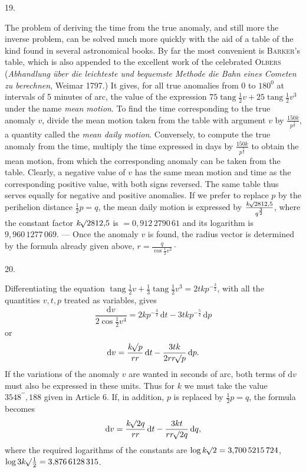 \par{}
\begin{center}
\hypertarget{native-037-article019}{}19.
\end{center}
The problem of deriving the time from the true anomaly, and still more the inverse problem, can be solved much more quickly with the aid of a table of the kind found in several astronomical books. By far the most convenient is \textsc{Barker}'s table, which is also appended to the excellent work of the celebrated \textsc{Olbers} (\emph{Abhandlung über die leichteste und bequemste Methode die Bahn eines Cometen zu berechnen}, Weimar 1797.) It gives, for all true anomalies from 0 to $180^0$ at intervals of 5 minutes of arc, the value of the expression $75\operatorname{tang}\frac{1}{2}v+25\operatorname{tang}\frac{1}{2}v^3$ under the name \emph{mean motion}. To find the time corresponding to the true anomaly $v$, divide the mean motion taken from the table with argument $v$ by $\frac{150k}{p^{\frac{3}{2}}}$, a quantity called the \emph{mean daily motion}. Conversely, to compute the true anomaly from the time, multiply the time expressed in days by $\frac{150k}{p^{\frac{3}{2}}}$ to obtain the mean motion, from which the corresponding anomaly can be taken from the table. Clearly, a negative value of $v$ has the same mean motion and time as the corresponding positive value, with both signs reversed. The same table thus serves equally for negative and positive anomalies. If we prefer to replace $p$ by the perihelion distance $\frac{1}{2}p=q$, the mean daily motion is expressed by $\frac{k\mathord{{}^{}\!\surd}2812{,}5}{q^{\frac{3}{2}}}$, where the constant factor $k\mathord{{}^{}\!\surd}2812{,}5$ is $=0{,}912\,2790\,61$ and its logarithm is $9{,}960\,1277\,069$. — Once the anomaly $v$ is found, the radius vector is determined by the formula already given above, $r=\frac{q}{\cos\frac{1}{2}v^2}\cdot$

\par{}
\begin{center}
\hypertarget{native-037-article020}{}20.
\end{center}
Differentiating the equation $\operatorname{tang}\frac{1}{2}v+\frac{1}{3}\operatorname{tang}\frac{1}{2}v^3=2t k p^{-\frac{3}{2}}$, with all the quantities $v,t,p$ treated as variables, gives
\[
\frac{\mathrm{d}v}{2\cos\frac{1}{2}v^4}=2k p^{-\frac{3}{2}}\,\mathrm{d}t-3t k p^{-\frac{5}{2}}\,\mathrm{d}p
\]
or
\[
\mathrm{d}v=\frac{k\mathord{{}^{}\!\surd}p}{r r}\,\mathrm{d}t-\frac{3t k}{2r r\mathord{{}^{}\!\surd}p}\,\mathrm{d}p.
\]
If the variations of the anomaly $v$ are wanted in seconds of arc, both terms of $\mathrm{d}v$ must also be expressed in these units. Thus for $k$ we must take the value $3548^{\prime\prime}{,}188$ given in Article 6. If, in addition, $p$ is replaced by $\frac{1}{2}p=q$, the formula becomes
\[
\mathrm{d}v=\frac{k\mathord{{}^{}\!\surd}2q}{r r}\,\mathrm{d}t-\frac{3k t}{r r\mathord{{}^{}\!\surd}2q}\,\mathrm{d}q,
\]
where the required logarithms of the constants are $\log k\mathord{{}^{}\!\surd}2=3{,}700\,5215\,724$,\\ $\log 3k\mathord{{}^{}\!\surd}\frac{1}{2}=3{,}876\,6128\,315$.

